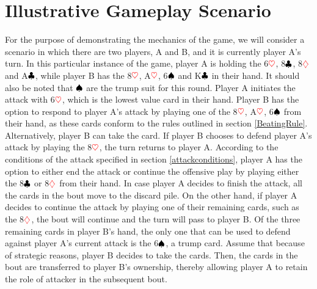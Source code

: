 \section{Illustrative Gameplay Scenario}
\label{illustration}
For the purpose of demonstrating the mechanics of the game, we will consider a scenario in which there are two players, A and B, and it is currently player A's turn. In this particular instance of the game, player A is holding the 6$\textcolor{red}{\heartsuit}$, 8$\textcolor{black}{\clubsuit}$, 8$\textcolor{red}{\diamondsuit}$ and A$\textcolor{black}{\clubsuit}$, while player B has the 8$\textcolor{red}{\heartsuit}$, A$\textcolor{red}{\heartsuit}$, 6$\textcolor{black}{\spadesuit}$ and K$\textcolor{black}{\clubsuit}$ in their hand. It should also be noted that $\textcolor{black}{\spadesuit}$ are the trump suit for this round. Player A initiates the attack with 6$\textcolor{red}{\heartsuit}$, which is the lowest value card in their hand. Player B has the option to respond to player A's attack by playing one of the 8$\textcolor{red}{\heartsuit}$, A$\textcolor{red}{\heartsuit}$, 6$\textcolor{black}{\spadesuit}$ from their hand, as these cards conform to the rules outlined in section \ref{BeatingRule}. Alternatively, player B can take the card. If player B chooses to defend player A's attack by playing the 8$\textcolor{red}{\heartsuit}$, the turn returns to player A. According to the conditions of the attack specified in section \ref{attackconditions}, player A has the option to either end the attack or continue the offensive play by playing either the 8$\textcolor{black}{\clubsuit}$ or 8$\textcolor{red}{\diamondsuit}$ from their hand. In case player A decides to finish the attack, all the cards in the bout move to the discard pile. On the other hand, if player A decides to continue the attack by playing one of their remaining cards, such as the 8$\textcolor{red}{\diamondsuit}$, the bout will continue and the turn will pass to player B. Of the three remaining cards in player B's hand, the only one that can be used to defend against player A's current attack is the 6$\textcolor{black}{\spadesuit}$, a trump card. Assume that because of strategic reasons, player B decides to take the cards. Then, the cards in the bout are transferred to player B's ownership, thereby allowing player A to retain the role of attacker in the subsequent bout.
